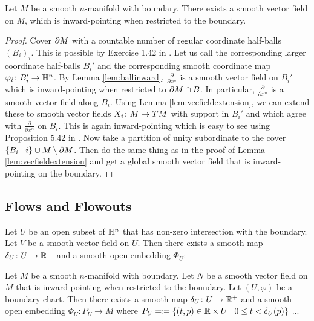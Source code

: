 \begin{lem}
    Let $M$ be a smooth $n$-manifold with boundary. There exists a smooth vector field on $M$, which is inward-pointing when restricted to the boundary.
\end{lem}

\begin{proof}
    Cover $\partial M$ with a countable number of regular coordinate half-balls $(B_i)_i$. 
    This is possible by Exercise 1.42 in \cite{Lee2006}.
    Let us call the corresponding larger coordinate half-balls $B_i'$ and the corresponding smooth coordinate map $\varphi_i \colon B_i' \to \mathbb{H}^n$. 
    By Lemma \ref{lem:ballinward}, $\frac{\partial}{\partial x^n}$ is a smooth vector field on $B_i'$ which is inward-pointing when restricted to $\partial M \cap B$. 
    In particular, $\frac{\partial}{\partial x^n}$ is a smooth vector field along $B_i$. 
    Using Lemma \ref{lem:vecfieldextension}, we can extend these to smooth vector fields $X_i \colon M \to TM$ with support in $B_i'$ and which agree with $\frac{\partial}{\partial x^n}$ on $B_i$. 
    This is again inward-pointing which is easy to see using Proposition 5.42 in \cite{Lee2006} .
    Now take a partition of unity subordinate to the cover $\{B_i \mid i\} \cup M \setminus \partial M$. 
    Then do the same thing as in the proof of Lemma \ref{lem:vecfieldextension} and get a global smooth vector field that is inward-pointing on the boundary. 
\end{proof}

\subsection{Flows and Flowouts}

\begin{lem}
    Let $U$ be an open subset of $\mathbb{H}^n$ that has non-zero intersection with the boundary.
    Let $V$ be a smooth vector field on $U$. 
    Then there exists a smooth map $\delta_U \colon U \to \mathbb{R}+$ and a smooth open embedding $\Phi_U \colon $ 
\end{lem}

\begin{lem}
    Let $M$ be a smooth $n$-manifold with boundary.
    Let $N$ be a smooth vector field on $M$ that is inward-pointing when restricted to the boundary. 
    Let $(U, \varphi)$ be a boundary chart. 
    Then there exists a smooth map $\delta_U \colon U \to \mathbb{R}^+$ and a smooth open embedding $\Phi_U \colon P_U \to M$ where $P_U = \coloneq \{ (t, p) \in \mathbb{R} \times U \mid 0 \leq t < \delta_U (p)\}$ ...
\end{lem}

